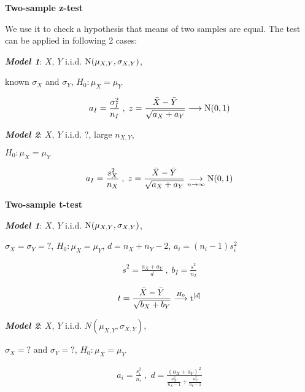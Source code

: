 \noindent \textbf{Two-sample z-test}

We use it to check a hypothesis that means of two samples are equal. The test can be applied in
following 2 cases:

\vspace{10pt}
\textbf{\em Model 1}:
$X$, $Y$ i.i.d. $\textrm{N}(\mu_{X,Y}, \sigma_{X,Y})$,

known $\sigma_X$ and $\sigma_Y$, $H_0: \mu_X=\mu_Y$

\vspace{-15pt}
\begin{gather*}
a_I=\frac{\sigma_I^2}{n_I} \;,\;
z=\frac{\bar{X}-\bar{Y}}{ \sqrt{a_X+a_Y} }
\longrightarrow \textrm{N}(0,1)
\end{gather*}

\textbf{\em Model 2}:
$X$, $Y$ i.i.d. ?, large $n_{X,Y}$,

$H_0: \mu_X=\mu_Y$

\vspace{-15pt}
\begin{gather*}
a_I=\frac{s_X^2}{n_X} \;,\;
z=\frac{\bar{X}-\bar{Y}}{ \sqrt{a_X+a_Y} }
\underset{n \rightarrow \infty}{\longrightarrow} \textrm{N}(0,1)
\end{gather*}

\noindent \textbf{Two-sample t-test}

\vspace{10pt}
\textbf{\em Model 1}:
$X$, $Y$ i.i.d. $\textrm{N}(\mu_{X,Y}, \sigma_{X,Y})$, 

$\sigma_X=\sigma_Y=?$, $H_0: \mu_X=\mu_Y$, 
$d = n_X+n_Y-2$, $a_i = (n_i - 1)s_i^2$

\vspace{-15pt}
\begin{gather*}
\dot{s}^2 = \frac{a_X + a_Y}{d} \;,\; 
b_I=\frac{\dot{s}^2}{n_I}
\end{gather*}

\[ t=\frac{\bar{X}-\bar{Y}}{ \sqrt{b_X+b_Y} }
\overset{H_0}{\longrightarrow} \textrm{t}^{[d]} \]

\textbf{\em Model 2}:
$X$, $Y$ i.i.d. $N(\mu_{X,Y}, \sigma_{X,Y})$, 

$\sigma_X=?$ and $\sigma_Y=?$, $H_0: \mu_X=\mu_Y$

\vspace{-15pt}
\begin{gather*}
a_i = \frac{s_i^2}{n_i} \;,\;
d = \frac{(a_X + a_Y)^2}{ \frac{a_X^2}{n_X-1}+\frac{a_Y^2}{n_Y-1} }
\end{gather*}

